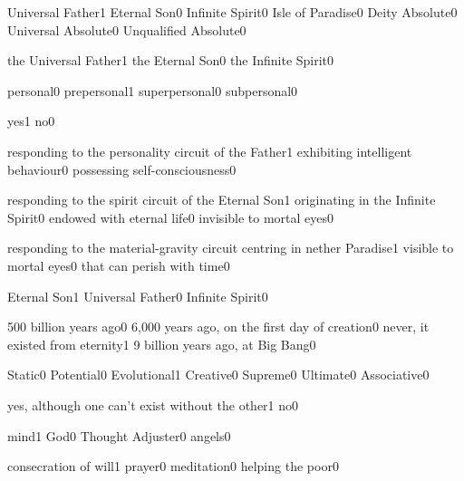 {Universal Father}{1}
{Eternal Son}{0}
{Infinite Spirit}{0}
{Isle of Paradise}{0}
{Deity Absolute}{0}
{Universal Absolute}{0}
{Unqualified Absolute}{0}
\qstop

{the Universal Father}{1}
{the Eternal Son}{0}
{the Infinite Spirit}{0}
\qstop

{personal}{0}
{prepersonal}{1}
{superpersonal}{0}
{subpersonal}{0}
\qstop

{yes}{1}
{no}{0}
\qstop

{responding to the personality circuit of the Father}{1}
{exhibiting intelligent behaviour}{0}
{possessing self-consciousness}{0}
\qstop

{responding to the spirit circuit of the Eternal Son}{1}
{originating in the Infinite Spirit}{0}
{endowed with eternal life}{0}
{invisible to mortal eyes}{0}
\qstop

{responding to the material-gravity circuit centring in nether Paradise}{1}
{visible to mortal eyes}{0}
{that can perish with time}{0}
\qstop

{Eternal Son}{1}
{Universal Father}{0}
{Infinite Spirit}{0}
\qstop

{500 billion years ago}{0}
{6,000 years ago, on the first day of creation}{0}
{never, it existed from eternity}{1}
{9 billion years ago, at Big Bang}{0}
\qstop

{Static}{0}
{Potential}{0}
{Evolutional}{1}
{Creative}{0}
{Supreme}{0}
{Ultimate}{0}
{Associative}{0}
\qstop

{yes, although one can't exist without the other}{1}
{no}{0}
\qstop

{mind}{1}
{God}{0}
{Thought Adjuster}{0}
{angels}{0}
\qstop


{consecration of will}{1}
{prayer}{0}
{meditation}{0}
{helping the poor}{0}
\qstop

